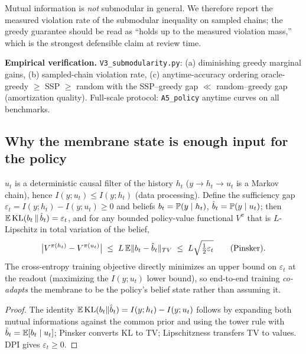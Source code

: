 \begin{remark}
Mutual information is \emph{not} submodular in general. We therefore report
the measured violation rate of the submodular inequality on sampled chains;
the greedy guarantee should be read as ``holds up to the measured violation
mass,'' which is the strongest defensible claim at review time.
\end{remark}

\noindent\textbf{Empirical verification.} \texttt{V3\_submodularity.py}:
(a) diminishing greedy marginal gains, (b) sampled-chain violation rate,
(c) anytime-accuracy ordering oracle-greedy $\ge$ SSP $\ge$ random with the
SSP--greedy gap $\ll$ random--greedy gap (amortization quality).
Full-scale protocol: \texttt{A5\_policy} anytime curves on all benchmarks.

\subsection{Why the membrane state is enough input for the policy}

\begin{proposition}\label{prop:suff}
$u_t$ is a deterministic causal filter of the history $h_t$
($y\to h_t\to u_t$ is a Markov chain), hence
$I(y;u_t)\le I(y;h_t)$ (data processing). Define the sufficiency gap
$\varepsilon_t = I(y;h_t)-I(y;u_t)\ge 0$ and beliefs
$b_t=\mathbb{P}(y\mid h_t)$, $\hat b_t=\mathbb{P}(y\mid u_t)$; then
$\mathbb{E}\,\mathrm{KL}(b_t\,\|\,\hat b_t)=\varepsilon_t$, and for any bounded
policy-value functional $V^\pi$ that is $L$-Lipschitz in total variation of
the belief,
\begin{equation}
  \big|V^{\pi(h_t)}-V^{\pi(u_t)}\big| \;\le\; L\,\mathbb{E}\|b_t-\hat b_t\|_{TV}
  \;\le\; L\sqrt{\tfrac{1}{2}\varepsilon_t}
  \qquad\text{(Pinsker).}
  \label{eq:suff}
\end{equation}
The cross-entropy training objective directly minimizes an upper bound on
$\varepsilon_t$ at the readout (maximizing the $I(y;u_t)$ lower bound), so
end-to-end training \emph{co-adapts} the membrane to be the policy's
belief state rather than assuming it.
\end{proposition}
\begin{proof}
The identity $\mathbb{E}\,\mathrm{KL}(b_t\|\hat b_t)=I(y;h_t)-I(y;u_t)$ follows by
expanding both mutual informations against the common prior and using the
tower rule with $\hat b_t=\mathbb{E}[b_t\mid u_t]$; Pinsker converts KL to TV;
Lipschitzness transfers TV to values. DPI gives $\varepsilon_t\ge0$.
\end{proof}

